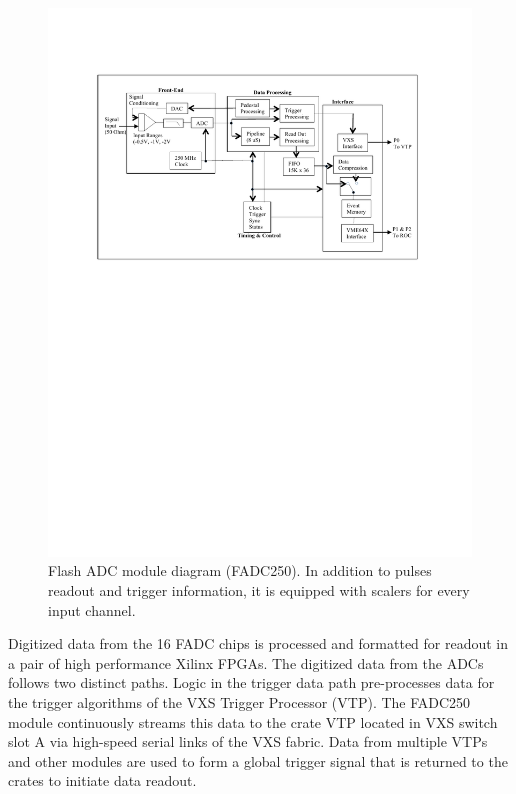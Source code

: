 \begin{figure}[hbt]
	\centering
	\includegraphics[width=1.0\columnwidth,keepaspectratio]{img/FADC250_Diagram.pdf}
	\caption{Flash ADC module diagram (FADC250). In addition to pulses readout and trigger information, it is equipped with scalers for every input channel.}
	\label{fig:FADC250_board}
\end{figure}

Digitized data from the 16 FADC chips is processed and formatted for readout in a pair of high performance Xilinx FPGAs. The digitized data from the ADCs follows two distinct paths.  Logic in the trigger data path pre-processes data for the trigger algorithms of the VXS Trigger Processor (VTP). The FADC250 module continuously streams this data to the crate VTP located in VXS switch slot A via high-speed serial links of the VXS fabric.  Data from multiple VTPs and other modules are used to form a global trigger signal that is returned to the crates to initiate data readout.

